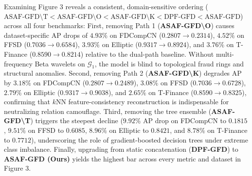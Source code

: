\documentclass[10pt,a4paper,twocolumn]{article}
\begin{document}
Examining Figure 3 reveals a consistent, domain-sensitive ordering ($\text{ASAF-GFD\textbackslash T} < \text{ASAF-GFD\textbackslash O} < \text{ASAF-GFD\textbackslash K} < \text{DPF-GFD} < \text{ASAF-GFD}$) across all four benchmarks: First, removing Path 1 (\textbf{ASAF-GFD\textbackslash O}) causes dataset-specific AP drops of $4.93\%$ on FDCompCN ($0.2807 \to 0.2314$), $4.52\%$ on FFSD ($0.7036 \to 0.6584$), $3.93\%$ on Elliptic ($0.9317 \to 0.8924$), and $3.76\%$ on T-Finance ($0.8590 \to 0.8214$) relative to the dual-path baseline. Without multi-frequency Beta wavelets on $\mathscr{G}_1$, the model is blind to topological fraud rings and structural anomalies. Second, removing Path 2 (\textbf{ASAF-GFD\textbackslash K}) degrades AP by $3.18\%$ on FDCompCN ($0.2807 \to 0.2489$), $3.08\%$ on FFSD ($0.7036 \to 0.6728$), $2.79\%$ on Elliptic ($0.9317 \to 0.9038$), and $2.65\%$ on T-Finance ($0.8590 \to 0.8325$), confirming that $k$NN feature-consistency reconstruction is indispensable for neutralizing relation camouflage. Third, removing the tree ensemble (\textbf{ASAF-GFD\textbackslash T}) triggers the steepest decline ($9.92\%$ AP drop on FDCompCN to $0.1815$, $9.51\%$ on FFSD to $0.6085$, $8.96\%$ on Elliptic to $0.8421$, and $8.78\%$ on T-Finance to $0.7712$), underscoring the role of gradient-boosted decision trees under extreme class imbalance. Finally, upgrading from static concatenation (\textbf{DPF-GFD}) to \textbf{ASAF-GFD (Ours)} yields the highest bar across every metric and dataset in Figure 3.

\begin{table}[!h]
  \centering
  \caption{Control experiments with a fixed XGBoost classifier evaluated via Average Precision ($\text{AP Mean} \pm \text{Std}$ over 5 runs).}
  \label{tab:control_xgb}
\end{table}
\end{document}
